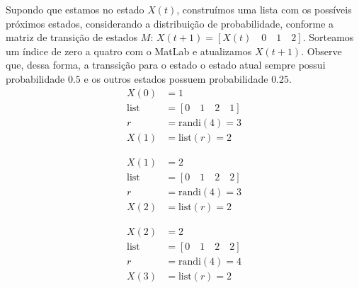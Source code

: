 \documentclass[12pt]{article}
\newenvironment{exercise}[2][Exercício]{\begin{trivlist}
\item[\hskip \labelsep {\bfseries #1}\hskip \labelsep {\bfseries #2.}]}{\end{trivlist}}
\begin{document}
\begin{exercise}{1.b} Supondo que estamos no estado $X(t)$, construímos uma
lista com os possíveis próximos estados, considerando a distribuição de
probabilidade, conforme a matriz de transição de estados $M$:
$X(t+1) = [X(t) \quad 0 \quad 1 \quad 2]$. Sorteamos um índice de zero a quatro
com o MatLab e atualizamos $X(t+1)$. Observe que, dessa forma, a transsição
para o estado o estado atual sempre possui probabilidade $0.5$ e os outros
estados possuem probabilidade $0.25$.
\begin{align}
X(0) &= 1 \\
\nonumber \text{list} &= [0 \quad 1 \quad 2 \quad 1] \\
\nonumber r &= \text{randi}(4) = 3 \\
\nonumber X(1) &= \text{list}(r) = 2  
\end{align}

\begin{align}
X(1) &= 2 \\
\nonumber \text{list} &= [0 \quad 1 \quad 2 \quad 2] \\
\nonumber r &= \text{randi}(4) = 3 \\
\nonumber X(2) &= \text{list}(r) = 2  
\end{align}

\begin{align}
X(2) &= 2 \\
\nonumber \text{list} &= [0 \quad 1 \quad 2 \quad 2] \\
\nonumber r &= \text{randi}(4) = 4 \\
\nonumber X(3) &= \text{list}(r) = 2  
\end{align}

\end{exercise}
\end{document}
